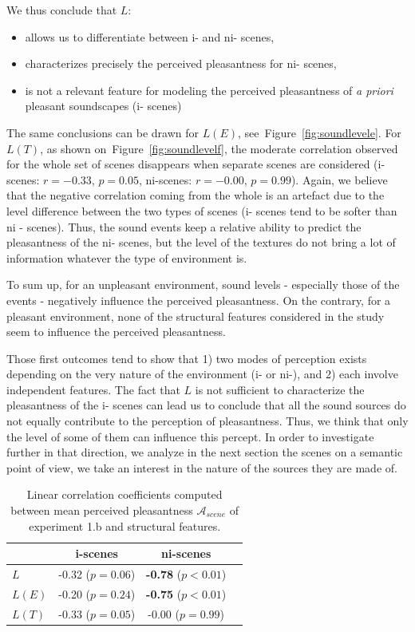 \documentclass[twoside,twocolumn]{article}
\begin{document}
We thus conclude that $L$:

\begin{itemize}
\item allows us to differentiate between i- and ni- scenes,
\item characterizes precisely the perceived pleasantness for ni- scenes,
\item is not a relevant feature for modeling the perceived pleasantness of \textit{a priori} pleasant soundscapes (i- scenes)
\end{itemize}

The same conclusions can be drawn for $L(E)$, see~Figure~\ref{fig:soundlevele}. For $L(T)$, as shown on~Figure~\ref{fig:soundlevelf}, the moderate correlation observed for the whole set of scenes disappears when separate scenes are considered (i-scenes: $r=-0.33$, $p=0.05$, ni-scenes: $r=-0.00$, $p=0.99$). Again, we believe that the negative correlation coming from the whole is an artefact due to the level difference between the two types of scenes (i- scenes tend to be softer than ni - scenes). Thus, the sound events keep a relative ability to predict the pleasantness of the ni- scenes, but the level of the textures do not bring a lot of information whatever the type of environment is.

To sum up, for an unpleasant environment, sound levels - especially those of the events - negatively influence the perceived pleasantness. On the contrary, for a pleasant environment, none of the structural features considered in the study seem to influence the perceived pleasantness.

Those first outcomes tend to show that 1) two modes of perception exists depending on the very nature of the environment (i- or ni-), and 2) each involve independent features. The fact that $L$ is not sufficient to characterize the pleasantness of the i- scenes can lead us to conclude that all the sound sources do not equally contribute to the perception of pleasantness. Thus, we think that only the level of some of them can influence this percept. In order to investigate further in that direction, we analyze in the next section the scenes on a semantic point of view, \ie we take an interest in the nature of the sources they are made of.

\begin{table}[t]
\centering
\begin{tabular}{l c c c}
               & i-scenes                   & ni-scenes    \\
\hline
$L$            & -0.32 ($p=0.06$)           & \textbf{-0.78} ($p<0.01$)\\
$L(E)$         & -0.20 ($p=0.24$)           & \textbf{-0.75} ($p<0.01$)\\
$L(T)$         & -0.33 ($p=0.05$)           &  -0.00 ($p=0.99$) \\
\hline
\end{tabular}
\vspace{0.5mm}
\caption{Linear correlation coefficients computed between mean perceived pleasantness $\mathcal{A}_{scene}$ of experiment 1.b and structural features.}
\label{tab:corrStructA}
\end{table}
\end{document}
